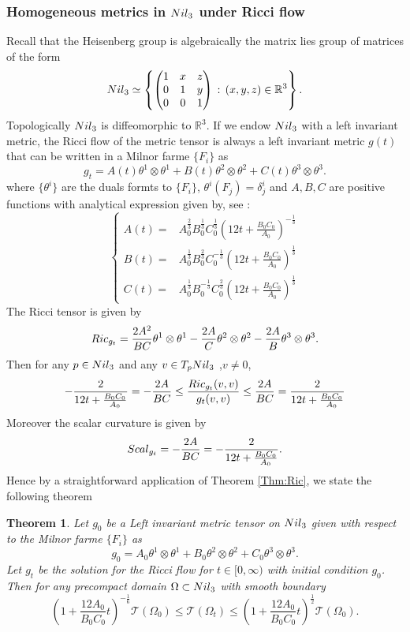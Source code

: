 \documentclass{amsart}
\newtheorem{theorem}{Theorem}[section]
\theoremstyle{definition}
\theoremstyle{remark}
\newcommand{\Ric}{{\rm Ric}}
\begin{document}
\subsubsection{Homogeneous metrics in ${\rm Nil}_3$ under Ricci flow}\label{Heisenberg}
Recall that the  Heisenberg group is algebraically the matrix lies group of matrices of the form
$$
{\rm Nil}_3\simeq \left\lbrace\begin{pmatrix}1& x& z \\
0&1&y\\
0&0&1\end{pmatrix}\, :\, (x,y,z)\in \mathbb{R}^3 \right\rbrace.
$$
Topologically ${\rm Nil}_3$ is diffeomorphic to $\mathbb{R}^3$. If we endow ${\rm Nil}_3$ with a left invariant metric, the Ricci flow of the metric tensor is always a left invariant metric $g(t)$ that can be written in a Milnor farme $\{F_i\}$ as 
$$
g_t=A(t)\theta^1\otimes\theta^1+B(t)\theta^2\otimes\theta^2+C(t)\theta^3\otimes\theta^3.
$$
where $\{\theta^i\}$ are the duals formts to $\{F_i\}$, $\theta^i(F_j)=\delta^i_j$ and $A,B,C$ are positive functions with analytical expression given by, see \cite{ChowLiNi}:
$$
\left\lbrace\begin{aligned}
    A(t)=&A_0^{\frac{2}{3}}B_0^{\frac{1}{3}}C_0^\frac{1}{3}\left(12t+\frac{B_0C_0}{A_0}\right)^{-\frac{1}{3}}\\
    B(t)=&A_0^{\frac{1}{3}}B_0^{\frac{2}{3}}C_0^{-\frac{1}{3}}\left(12t+\frac{B_0C_0}{A_0}\right)^{\frac{1}{3}}\\
    C(t)=&A_0^{\frac{1}{3}}B_0^{-\frac{1}{3}}C_0^\frac{2}{3}\left(12t+\frac{B_0C_0}{A_0}\right)^{\frac{1}{3}}
\end{aligned}\right.
$$
The Ricci tensor is given by
$$
\Ric_{g_t}=\frac{2A^2}{BC}\theta^1\otimes\theta^1-\frac{2A}{C}\theta^2\otimes\theta^2-\frac{2A}{B}\theta^3\otimes\theta^3.
$$
Then for any $p\in {\rm Nil}_3$ and any $v\in T_p{\rm Nil}_3$ ,$v\neq 0$,
$$
-\frac{2}{12t+\frac{B_0C_0}{A_0}}=-\frac{2A}{BC}\leq \frac{\Ric_{g_t}(v,v)}{g_t(v,v)}\leq \frac{2A}{BC}=\frac{2}{12t+\frac{B_0C_0}{A_0}}
$$
Moreover the scalar curvature is given by
$$
{\rm Scal}_{g_t}=-\frac{2A}{BC}=-\frac{2}{12t+\frac{B_0C_0}{A_0}}.
$$
Hence by a straightforward application of Theorem  \ref{Thm:Ric}, we state the following theorem
\begin{theorem}
Let $g_0$ be a Left invariant metric tensor on ${\rm Nil}_3$ given with respect to the Milnor farme $\{F_i\}$ as
$$
g_0=A_0\theta^1\otimes\theta^1+B_0\theta^2\otimes\theta^2+C_0\theta^3\otimes\theta^3.
$$
Let $g_t$ be the solution for the Ricci flow for $t\in [0,\infty)$ with initial condition $g_0$. Then for any precompact domain $\Omega\subset {\rm Nil}_3$ with smooth boundary
$$
\left(1+\frac{12A_0}{B_0C_0}t\right)^{-\frac{1}{6}}\mathcal{T}(\Omega_0)\leq\mathcal{T}(\Omega_t)\leq \left(1+\frac{12A_0}{B_0C_0}t\right)^{\frac{1}{2}}\mathcal{T}(\Omega_0).
$$
\end{theorem}
\end{document}

